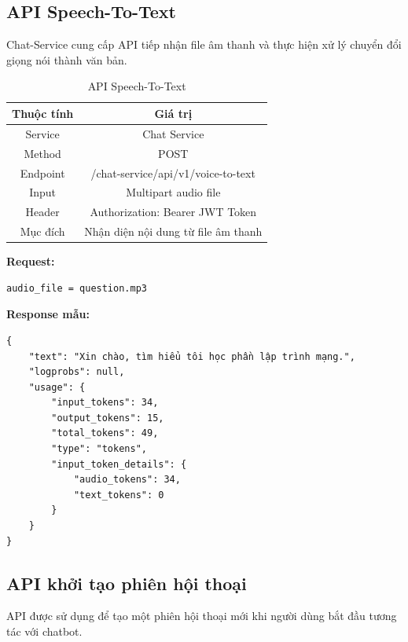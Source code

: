 \documentclass[../DoAn.tex]{subfiles}
\begin{document}
\subsection{API Speech-To-Text}
Chat-Service cung cấp API tiếp nhận file âm thanh và thực hiện xử lý chuyển đổi giọng nói thành văn bản.
\begin{table}[H]
    \centering
    \renewcommand{\arraystretch}{1.8}
    \begin{tabular}{|c|c|}
        \hline
        \textbf{Thuộc tính} & \textbf{Giá trị}                    \\
        \hline
        Service             & Chat Service                        \\
        \hline
        Method              & POST                                \\
        \hline
        Endpoint            & /chat-service/api/v1/voice-to-text  \\
        \hline
        Input               & Multipart audio file                \\
        \hline
        Header              & Authorization: Bearer JWT Token     \\
        \hline
        Mục đích            & Nhận diện nội dung từ file âm thanh \\
        \hline
    \end{tabular}
    \caption{API Speech-To-Text}
\end{table}

\textbf{Request:}
\begin{verbatim}
audio_file = question.mp3
\end{verbatim}

\textbf{Response mẫu:}
\begin{verbatim}
{
    "text": "Xin chào, tìm hiểu tôi học phần lập trình mạng.",
    "logprobs": null,
    "usage": {
        "input_tokens": 34,
        "output_tokens": 15,
        "total_tokens": 49,
        "type": "tokens",
        "input_token_details": {
            "audio_tokens": 34,
            "text_tokens": 0
        }
    }
}
\end{verbatim}
\clearpage


\subsection{API khởi tạo phiên hội thoại}
API được sử dụng để tạo một phiên hội thoại mới khi người dùng bắt đầu tương tác với chatbot.
\end{document}
